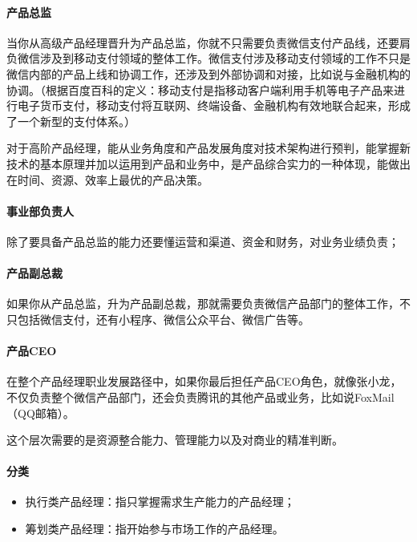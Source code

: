 \documentclass[letterpaper,11pt,english]{sphinxmanual}
\begin{document}
\paragraph{产品总监}
\label{\detokenize{chapter_experience/career_path:id6}}
当你从高级产品经理晋升为产品总监，你就不只需要负责微信支付产品线，还要肩负微信涉及到移动支付领域的整体工作。微信支付涉及移动支付领域的工作不只是微信内部的产品上线和协调工作，还涉及到外部协调和对接，比如说与金融机构的协调。（根据百度百科的定义：移动支付是指移动客户端利用手机等电子产品来进行电子货币支付，移动支付将互联网、终端设备、金融机构有效地联合起来，形成了一个新型的支付体系。）

对于高阶产品经理，能从业务角度和产品发展角度对技术架构进行预判，能掌握新技术的基本原理并加以运用到产品和业务中，是产品综合实力的一种体现，能做出在时间、资源、效率上最优的产品决策。


\paragraph{事业部负责人}
\label{\detokenize{chapter_experience/career_path:id7}}
除了要具备产品总监的能力还要懂运营和渠道、资金和财务，对业务业绩负责；


\paragraph{产品副总裁}
\label{\detokenize{chapter_experience/career_path:id8}}
如果你从产品总监，升为产品副总裁，那就需要负责微信产品部门的整体工作，不只包括微信支付，还有小程序、微信公众平台、微信广告等。


\paragraph{产品CEO}
\label{\detokenize{chapter_experience/career_path:ceo}}
在整个产品经理职业发展路径中，如果你最后担任产品CEO角色，就像张小龙，不仅负责整个微信产品部门，还会负责腾讯的其他产品或业务，比如说FoxMail（QQ邮箱）。

这个层次需要的是资源整合能力、管理能力以及对商业的精准判断。

\begin{center}\end{center} 


\paragraph{分类}
\label{\detokenize{chapter_experience/career_path:id9}}\begin{itemize}
\item {} 
执行类产品经理：指只掌握需求生产能力的产品经理；

\item {} 
筹划类产品经理：指开始参与市场工作的产品经理。

\end{itemize}
\end{document}
